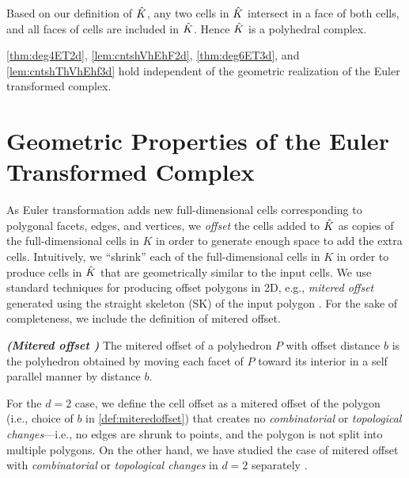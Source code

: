 \begin{rem}
  Based on our definition of $\hat{K}$, any two cells in $\hat{K}$ intersect in a face of both cells, and all faces of cells are included in $\hat{K}$.
  Hence $\hat{K}$ is a polyhedral complex.
\end{rem}

\vspace*{-0.3in}
\begin{rem}
 \cref{thm:deg4ET2d}, \cref{lem:cntshVhEhF2d}, \cref{thm:deg6ET3d}, and \cref{lem:cntshThVhEhf3d} hold independent of the geometric realization of the Euler transformed complex.
\end{rem}


\section{Geometric Properties of the Euler Transformed Complex} \label{sec:geomrlzn}

As Euler transformation adds new full-dimensional cells corresponding to polygonal facets, edges, and vertices, we \emph{offset} the cells added to $\hat{K}$ as copies of the full-dimensional cells in $K$ in order to generate enough space to add the extra cells.
Intuitively, we ``shrink'' each of the full-dimensional cells in $K$ in order to produce cells in $\hat{K}$ that are geometrically similar to the input cells.
We use standard techniques for producing offset polygons in 2D, e.g., \emph{mitered offset} generated using the straight skeleton (SK) of the input polygon \cite{AiAuAlGa1995}.
For the sake of completeness, we include the definition of mitered offset.

 \vspace*{-0.3in}
 \begin{defn} \label{def:miteredoffset}
      \emph{\bfseries (Mitered offset \cite{AiAuAlGa1995})}
      The mitered offset of a polyhedron $P$ with offset distance $b$ is the polyhedron obtained by moving each facet of $P$ toward its interior in a self parallel manner by distance $b$. 
 \end{defn}

For the $d=2$ case, we define the cell offset as a mitered offset of the polygon (i.e., choice of $b$ in \cref{def:miteredoffset}) that creates no \emph{combinatorial} or \emph{topological changes}---i.e., no edges are shrunk to points, and the polygon is not split into multiple polygons.
On the other hand, we have studied the case of mitered offset with \emph{combinatorial} or \emph{topological changes} in $d=2$ separately \cite{GuKrDr2020}.

